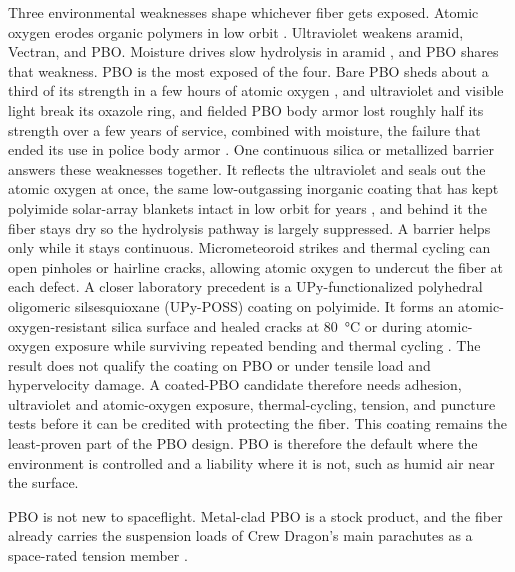 \documentclass{article}
\begin{document}
Three environmental weaknesses shape whichever fiber gets exposed. Atomic oxygen erodes organic polymers in low orbit \cite{ao_protection_banks}. Ultraviolet weakens aramid, Vectran, and PBO. Moisture drives slow hydrolysis in aramid \cite{kevlar_technical_guide}, and PBO shares that weakness. PBO is the most exposed of the four. Bare PBO sheds about a third of its strength in a few hours of atomic oxygen \cite{pbo_atomic_oxygen}, and ultraviolet and visible light break its oxazole ring, and fielded PBO body armor lost roughly half its strength over a few years of service, combined with moisture, the failure that ended its use in police body armor \cite{zylon_body_armor}. One continuous silica or metallized barrier answers these weaknesses together. It reflects the ultraviolet and seals out the atomic oxygen at once, the same low-outgassing inorganic coating that has kept polyimide solar-array blankets intact in low orbit for years \cite{ao_protection_banks}, and behind it the fiber stays dry so the hydrolysis pathway is largely suppressed. A barrier helps only while it stays continuous. Micrometeoroid strikes and thermal cycling can open pinholes or hairline cracks, allowing atomic oxygen to undercut the fiber at each defect. A closer laboratory precedent is a UPy-functionalized polyhedral oligomeric silsesquioxane (UPy-POSS) coating on polyimide. It forms an atomic-oxygen-resistant silica surface and healed cracks at \SI{80}{\celsius} or during atomic-oxygen exposure while surviving repeated bending and thermal cycling \cite{wang2018_self_healing_ao}. The result does not qualify the coating on PBO or under tensile load and hypervelocity damage. A coated-PBO candidate therefore needs adhesion, ultraviolet and atomic-oxygen exposure, thermal-cycling, tension, and puncture tests before it can be credited with protecting the fiber. This coating remains the least-proven part of the PBO design. PBO is therefore the default where the environment is controlled and a liability where it is not, such as humid air near the surface.

PBO is not new to spaceflight. Metal-clad PBO is a stock product, and the fiber already carries the suspension loads of Crew Dragon's main parachutes as a space-rated tension member \cite{crew_dragon_parachute, zylon_technical_info}.
\end{document}
